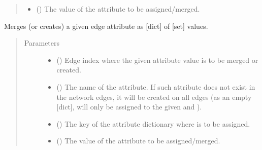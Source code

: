 \documentclass[letterpaper,10pt,english]{sphinxmanual}
\begin{document}
\begin{fulllineitems}
\begin{fulllineitems}
\begin{quote}
\begin{description}
\begin{itemize}
\item {} 
 () \textendash{} The value of the attribute to be assigned/merged.

\end{itemize}

\end{description}\end{quote}

\end{fulllineitems}


\begin{fulllineitems}
\label{\detokenize{main:pypath.main.PyPath.add_grouped_set_eattr}}
Merges (or creates) a given edge attribute as {[}dict{]} of {[}set{]}
values.
\begin{quote}\begin{description}
\item[{Parameters}] \leavevmode\begin{itemize}
\item {} 
 () \textendash{} Edge index where the given attribute value is to be merged
or created.

\item {} 
 () \textendash{} The name of the attribute. If such attribute does not exist
in the network edges, it will be created on all edges (as an
empty {[}dict{]},  will only be assigned to the given
 and ).

\item {} 
 () \textendash{} The key of the attribute dictionary where  is to be
assigned.

\item {} 
 () \textendash{} The value of the attribute to be assigned/merged.

\end{itemize}


\end{description}
\end{quote}
\end{fulllineitems}
\end{fulllineitems}
\end{document}
